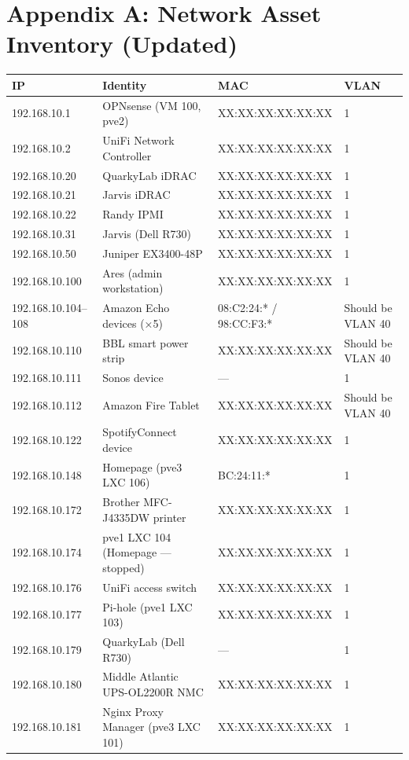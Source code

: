 \documentclass[11pt,a4paper]{article}
\begin{document}
\section{Appendix A: Network Asset Inventory (Updated)}

\begin{longtable}{@{}llll@{}}
\toprule
\textbf{IP} & \textbf{Identity} & \textbf{MAC} & \textbf{VLAN} \\
\midrule
\endhead
192.168.10.1 & OPNsense (VM 100, pve2) & XX:XX:XX:XX:XX:XX & 1 \\
192.168.10.2 & UniFi Network Controller & XX:XX:XX:XX:XX:XX & 1 \\
192.168.10.20 & QuarkyLab iDRAC & XX:XX:XX:XX:XX:XX & 1 \\
192.168.10.21 & Jarvis iDRAC & XX:XX:XX:XX:XX:XX & 1 \\
192.168.10.22 & Randy IPMI & XX:XX:XX:XX:XX:XX & 1 \\
192.168.10.31 & Jarvis (Dell R730) & XX:XX:XX:XX:XX:XX & 1 \\
192.168.10.50 & Juniper EX3400-48P & XX:XX:XX:XX:XX:XX & 1 \\
192.168.10.100 & Ares (admin workstation) & XX:XX:XX:XX:XX:XX & 1 \\
192.168.10.104--108 & Amazon Echo devices (×5) & 08:C2:24:* / 98:CC:F3:* & Should be VLAN 40 \\
192.168.10.110 & BBL smart power strip & XX:XX:XX:XX:XX:XX & Should be VLAN 40 \\
192.168.10.111 & Sonos device & — & 1 \\
192.168.10.112 & Amazon Fire Tablet & XX:XX:XX:XX:XX:XX & Should be VLAN 40 \\
192.168.10.122 & SpotifyConnect device & XX:XX:XX:XX:XX:XX & 1 \\
192.168.10.148 & Homepage (pve3 LXC 106) & BC:24:11:* & 1 \\
192.168.10.172 & Brother MFC-J4335DW printer & XX:XX:XX:XX:XX:XX & 1 \\
192.168.10.174 & pve1 LXC 104 (Homepage — stopped) & XX:XX:XX:XX:XX:XX & 1 \\
192.168.10.176 & UniFi access switch & XX:XX:XX:XX:XX:XX & 1 \\
192.168.10.177 & Pi-hole (pve1 LXC 103) & XX:XX:XX:XX:XX:XX & 1 \\
192.168.10.179 & QuarkyLab (Dell R730) & — & 1 \\
192.168.10.180 & Middle Atlantic UPS-OL2200R NMC & XX:XX:XX:XX:XX:XX & 1 \\
192.168.10.181 & Nginx Proxy Manager (pve3 LXC 101) & XX:XX:XX:XX:XX:XX & 1 \\

\end{longtable}
\end{document}
